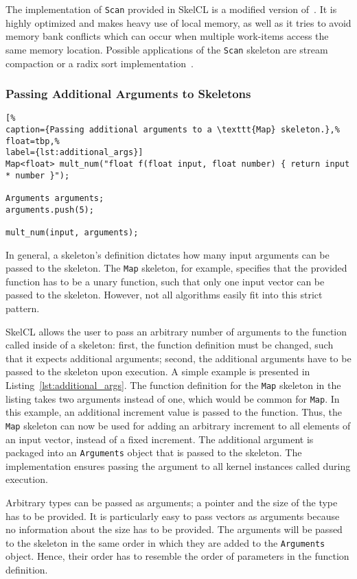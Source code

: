 The implementation of \texttt{Scan} provided in SkelCL is a modified version of~\cite{HaSO-07}.
It is highly optimized and makes heavy use of local memory, as well as it tries to avoid memory bank conflicts which can occur when multiple work-items access the same memory location.
Possible applications of the \texttt{Scan} skeleton are stream compaction or a radix sort implementation~\cite{HaSO-07}.


\subsubsection{Passing Additional Arguments to Skeletons}

\begin{lstlisting}[%
caption={Passing additional arguments to a \texttt{Map} skeleton.},%
float=tbp,%
label={lst:additional_args}]
Map<float> mult_num("float f(float input, float number) { return input * number }");

Arguments arguments;
arguments.push(5);

mult_num(input, arguments);
\end{lstlisting}

In general, a skeleton's definition dictates how many input arguments can be passed to the skeleton.
The \texttt{Map} skeleton, for example, specifies that the provided function has to be a unary function, such that only one input vector can be passed to the skeleton.
However, not all algorithms easily fit into this strict pattern.

SkelCL allows the user to pass an arbitrary number of arguments to the function called inside of a skeleton:
first, the function definition must be changed, such that it expects additional arguments;
second, the additional arguments have to be passed to the skeleton upon execution.
A simple example is presented in Listing~\ref{lst:additional_args}.
The function definition for the \texttt{Map} skeleton in the listing takes two arguments instead of one, which would be common for \texttt{Map}.
In this example, an additional increment value is passed to the function.
Thus, the \texttt{Map} skeleton can now be used for adding an arbitrary increment to all elements of an input vector, instead of a fixed increment.
The additional argument is packaged into an \texttt{Arguments} object that is passed to the skeleton.
The implementation ensures passing the argument to all kernel instances called during execution.

Arbitrary types can be passed as arguments; a pointer and the size of the type has to be provided.
It is particularly easy to pass vectors as arguments because no information about the size has to be provided.
The arguments will be passed to the skeleton in the same order in which they are added to the \texttt{Arguments} object.
Hence, their order has to resemble the order of parameters in the function definition.

